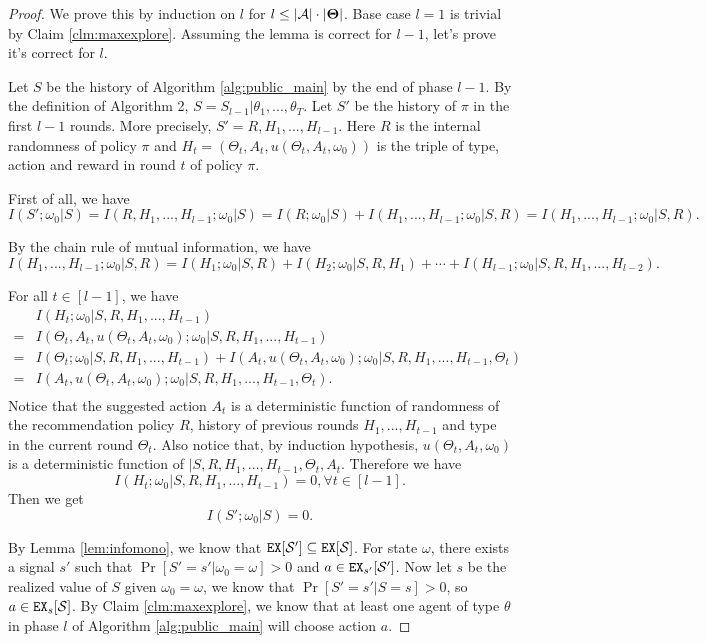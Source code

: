 \begin{proof}
We prove this by induction on $l$ for $l \leq |\mathcal{A}|\cdot |\bold{\Theta}|$. Base case $l=1$ is trivial by Claim \ref{clm:maxexplore}. Assuming the lemma is correct for $l-1$, let's prove it's correct for $l$.

Let $S$ be the history of Algorithm \ref{alg:public_main} by the end of phase $l-1$. By the definition of Algorithm 2, $S = S_{l-1} | \theta_1,...,\theta_T$.  Let $S'$ be the history of $\pi$ in the first $l-1$ rounds. More precisely, $S' = R, H_1,...,H_{l-1}$. Here $R$ is the internal randomness of policy $\pi$ and $H_t = (\Theta_t, A_t, u(\Theta_t, A_t, \omega_0))$ is the triple of type, action and reward in round $t$ of policy $\pi$.

First of all, we have
\[
I(S'; \omega_0| S) = I(R,H_1,...,H_{l-1}; \omega_0| S)  = I(R; \omega_0| S) + I(H_1,...,H_{l-1}; \omega_0|S, R) = I(H_1,...,H_{l-1}; \omega_0|S, R).
\]

By the chain rule of mutual information, we have
\[
 I(H_1,...,H_{l-1}; \omega_0|S, R) = I(H_1;\omega_0|S,R) + I(H_2;\omega_0|S, R ,H_1) + \cdots + I(H_{l-1}; \omega_0|S,R,H_1,...,H_{l-2}).
\]

For all $t \in [l-1]$, we have
\begin{align*}
&I(H_t; \omega_0|S,R,H_1,...,H_{t-1}) \\
=& I(\Theta_t, A_t, u(\Theta_t, A_t, \omega_0); \omega_0|S,R,H_1,...,H_{t-1}) \\
=& I(\Theta_t ; \omega_0|S,R,H_1,...,H_{t-1}) +  I(A_t, u(\Theta_t, A_t, \omega_0); \omega_0|S,R,H_1,...,H_{t-1},\Theta_t) \\
=& I(A_t, u(\Theta_t, A_t, \omega_0); \omega_0|S,R,H_1,...,H_{t-1},\Theta_t). \\
\end{align*}
Notice that the suggested action $A_t$ is a deterministic function of randomness of the recommendation policy $R$,  history of previous rounds $H_1,...,H_{t-1}$ and type in the current round $\Theta_t$. Also notice that, by induction hypothesis, $u(\Theta_t, A_t, \omega_0)$ is a deterministic function of $|S,R,H_1,...,H_{t-1},\Theta_t, A_t$. Therefore we have
\[
I(H_t; \omega_0|S,R,H_1,...,H_{t-1}) = 0, \forall t \in [l-1].
\]
Then we get
\[
I(S'; \omega_0 | S) = 0.
\]

By Lemma \ref{lem:infomono}, we know that $\mathtt{EX}[\mathcal{S}'] \subseteq \mathtt{EX}[\mathcal{S}]$. For state $\omega$, there exists a signal $s'$ such that $\Pr[S'=s'|\omega_0 =\omega] >0 $ and $a \in \mathtt{EX}_{s'} [\mathcal{S}']$. Now let $s$ be the realized value of $S$ given $\omega_0 = \omega$, we know that $\Pr[S'=s'|S=s] >0$, so $a \in \mathtt{EX}_s[\mathcal{S}]$. By Claim \ref{clm:maxexplore}, we know that at least one agent of type $\theta$ in phase $l$ of Algorithm \ref{alg:public_main} will choose action $a$.


\end{proof}
